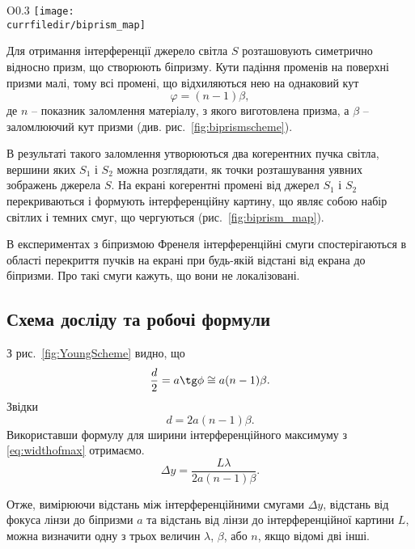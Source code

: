 \begin{wrapfigure}[12]{O}{0.3\columnwidth}
	\centering
	\texttt{[image: \\currfiledir/biprism\_map]}
	\caption{Інтерференційна картина}
	\label{fig:biprism_map}
\end{wrapfigure}
Для отримання інтерференції джерело світла $S$ розташовують симетрично відносно призм, що створюють біпризму. Кути падіння променів на поверхні призми малі, тому всі промені, що відхиляються нею на однаковий кут
\begin{equation}
	\varphi = (n-1)\beta,
\end{equation}
де $n$ -- показник заломлення матеріалу, з якого виготовлена призма, а $\beta$ -- заломлюючий кут призми (див. рис.~\ref{fig:biprismscheme}).

В результаті такого заломлення утворюються два когерентних пучка світла, вершини яких $S_1$ і $S_2$ можна розглядати, як точки розташування уявних зображень джерела $S$. На екрані когерентні промені від джерел $S_1$ і $S_2$ перекриваються і формують інтерференційну картину, що являє собою набір світлих і темних смуг, що чергуються (рис.~\ref{fig:biprism_map}).

В експериментах з біпризмою Френеля інтерференційні смуги спостерігаються в області перекриття пучків на екрані при будь-якій відстані від екрана до біпризми. Про такі смуги кажуть, що вони не локалізовані.

\subsection{Схема досліду та робочі формули}

З рис.~\ref{fig:YoungScheme} видно, що
\begin{equation}
	\frac{d}{2} = a \tg\phi  \cong a(n-1)\beta.
\end{equation}
Звідки
\begin{equation*}
	d  = 2a(n-1)\beta.
\end{equation*}
Використавши формулу для ширини інтерференційного максимуму з \eqref{eq:widthofmax} отримаємо.
\begin{equation}
	\Delta y = \frac{L \lambda }{2a (n - 1)\beta} \label{eq:deltax}.
\end{equation}


Отже, вимірюючи відстань між інтерференційними смугами $\Delta y$, відстань від фокуса лінзи до біпризми $a$ та відстань від лінзи до інтерференційної картини $L$, можна визначити одну з трьох величин $\lambda$, $\beta$, або $n$, якщо відомі дві інші.

